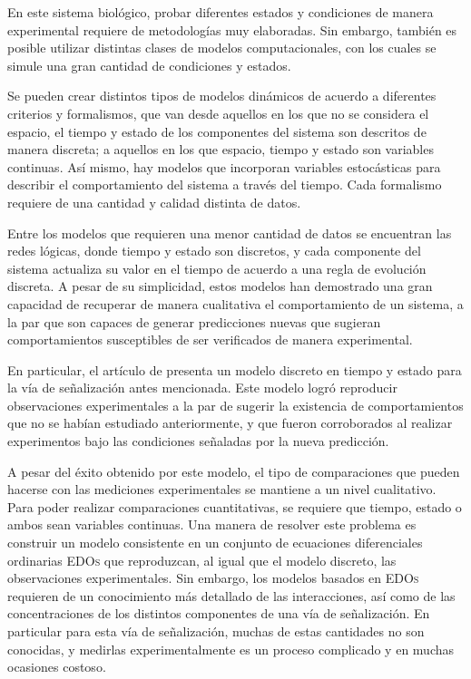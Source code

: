 En este sistema biológico, probar diferentes estados y condiciones de manera experimental requiere de metodologías muy elaboradas. Sin embargo, también es posible utilizar distintas clases de modelos computacionales, con los cuales se simule una gran cantidad de condiciones y estados.

Se pueden crear distintos tipos de modelos dinámicos de acuerdo a diferentes criterios y formalismos, que van desde aquellos en los que no se considera el espacio, el tiempo y estado de los componentes del sistema son descritos de manera discreta; a aquellos en los que espacio, tiempo y estado son variables continuas. Así mismo, hay modelos que incorporan variables estocásticas para describir el comportamiento del sistema a través del tiempo. Cada formalismo requiere de una cantidad y calidad distinta de datos.

Entre los modelos que requieren una menor cantidad de datos se encuentran las redes lógicas, donde tiempo y estado son discretos, y cada componente del sistema actualiza su valor en el tiempo de acuerdo a una regla de evolución discreta. A pesar de su simplicidad, estos modelos han demostrado una gran capacidad de recuperar de manera cualitativa el comportamiento de un sistema, a la par que son capaces de generar predicciones nuevas que sugieran comportamientos susceptibles de ser verificados de manera experimental.

En particular, el artículo de \citet{Espinal2011} presenta un modelo discreto en tiempo y estado para la vía de señalización antes mencionada. Este modelo logró reproducir observaciones experimentales a la par de sugerir la existencia de comportamientos que no se habían estudiado anteriormente, y que fueron corroborados al realizar experimentos bajo las condiciones señaladas por la nueva predicción.

A pesar del éxito obtenido por este modelo, el tipo de comparaciones que pueden hacerse con las mediciones experimentales se mantiene a un nivel cualitativo. Para poder realizar comparaciones cuantitativas, se requiere que tiempo, estado o ambos sean variables continuas. Una manera de resolver este problema es construir un modelo consistente en un conjunto de ecuaciones diferenciales ordinarias \textsc{EDOs} que reproduzcan, al igual que el modelo discreto, las observaciones experimentales. Sin embargo, los modelos basados en \textsc{EDOs} requieren de un conocimiento más detallado de las interacciones, así como de las concentraciones de los distintos componentes de una vía de señalización. En particular para esta vía de señalización, muchas de estas cantidades no son conocidas, y medirlas experimentalmente es un proceso complicado y en muchas ocasiones costoso. 

